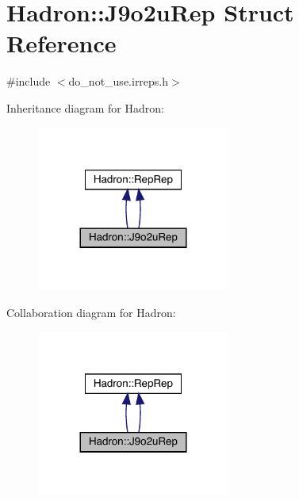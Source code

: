 \hypertarget{structHadron_1_1J9o2uRep}{}\section{Hadron\+:\+:J9o2u\+Rep Struct Reference}
\label{structHadron_1_1J9o2uRep}


{\ttfamily \#include $<$do\+\_\+not\+\_\+use.\+irreps.\+h$>$}



Inheritance diagram for Hadron\+:
\nopagebreak
\begin{figure}[H]
\begin{center}
\leavevmode
\includegraphics[width=180pt]{d5/dc4/structHadron_1_1J9o2uRep__inherit__graph}
\end{center}
\end{figure}


Collaboration diagram for Hadron\+:
\nopagebreak
\begin{figure}[H]
\begin{center}
\leavevmode
\includegraphics[width=180pt]{d0/d69/structHadron_1_1J9o2uRep__coll__graph}
\end{center}
\end{figure}
